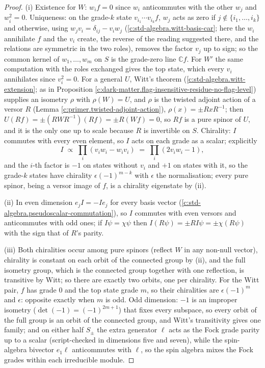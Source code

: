 \documentclass[11pt]{article}
\theoremstyle{definition}
\theoremstyle{plain}
\providecommand{\C}{}\renewcommand{\C}{\mathbb{C}}
\begin{document}
\begin{proof}
(i) Existence for $W$: $w_{i}f = 0$ since $w_{i}$ anticommutes with the other $w_{j}$ and $w_{i}^{2} = 0$. Uniqueness: on the grade-$k$ state $v_{i_{1}}\cdots v_{i_{k}}f$, $w_{j}$ acts as zero if $j \notin \{i_{1}, \ldots, i_{k}\}$ and otherwise, using $w_{j}v_{i} = \delta_{ij} - v_{i}w_{j}$ (\ref{c:std-algebra.witt-basis-car}; here the $w_{i}$ annihilate $f$ and the $v_{i}$ create, the reverse of the reading suggested there, and the relations are symmetric in the two roles), removes the factor $v_{j}$ up to sign; so the common kernel of $w_{1}, \ldots, w_{m}$ on $S$ is the grade-zero line $\C f$. For $W'$ the same computation with the roles exchanged gives the top state, which every $v_{i}$ annihilates since $v_{i}^{2} = 0$. For a general $U$, Witt's theorem (\ref{c:std-algebra.witt-extension}; as in Proposition \ref{c:dark-matter.flag-insensitive-residue-no-flag-level}) supplies an isometry $\rho$ with $\rho(W) = U$, and $\rho$ is the twisted adjoint action of a versor $R$ (Lemma \ref{c:primer.twisted-adjoint-action}), $\rho(x) = \pm RxR^{-1}$; then $U(Rf) = \pm (RWR^{-1})(Rf) = \pm R(Wf) = 0$, so $Rf$ is a pure spinor of $U$, and it is the only one up to scale because $R$ is invertible on $S$. Chirality: $I$ commutes with every even element, so $I$ acts on each grade as a scalar; explicitly
\[
I \;\propto\; \prod_{i}(v_{i}w_{i} - w_{i}v_{i}) \;=\; \prod_{i}(2v_{i}w_{i} - 1),
\]
and the $i$-th factor is $-1$ on states without $v_{i}$ and $+1$ on states with it, so the grade-$k$ states have chirality $\epsilon(-1)^{m-k}$ with $\epsilon$ the normalisation; every pure spinor, being a versor image of $f$, is a chirality eigenstate by (ii).

(ii) In even dimension $e_{j}I = -Ie_{j}$ for every basis vector (\ref{c:std-algebra.pseudoscalar-commutation}), so $I$ commutes with even versors and anticommutes with odd ones; if $I\psi = \chi\psi$ then $I(R\psi) = \pm R I\psi = \pm\chi(R\psi)$ with the sign that of $R$'s parity.

(iii) Both chiralities occur among pure spinors (reflect $W$ in any non-null vector), chirality is constant on each orbit of the connected group by (ii), and the full isometry group, which is the connected group together with one reflection, is transitive by Witt; so there are exactly two orbits, one per chirality. For the Witt pair, $f$ has grade $0$ and the top state grade $m$, so their chiralities are $\epsilon(-1)^{m}$ and $\epsilon$: opposite exactly when $m$ is odd. Odd dimension: $-1$ is an improper isometry ($\det(-1) = (-1)^{2m+1}$) that fixes every subspace, so every orbit of the full group is an orbit of the connected group, and Witt's transitivity gives one family; and on either half $S_{\pm}$ the extra generator $\ell$ acts as the Fock grade parity up to a scalar (script-checked in dimensions five and seven), while the spin-algebra bivector $e_{1}\ell$ anticommutes with $\ell$, so the spin algebra mixes the Fock grades within each irreducible module.


\end{proof}
\end{document}
